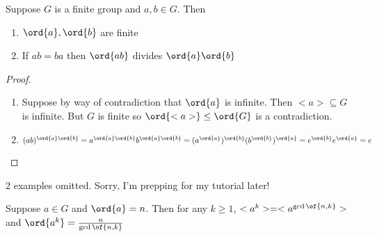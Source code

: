 \begin{corollary}
    Suppose $G$ is a finite group and $a,b \in G$. Then \begin{enumerate}
        \item $\ord{a}, \ord{b}$ are finite
        \item If $ab = ba$ then $\ord{ab}$ divides $\ord{a} \ord{b}$
    \end{enumerate}
\end{corollary}
\begin{proof}
    \begin{enumerate}
        \item Suppose by way of contradiction that $\ord{a}$ is infinite. Then $<a> \subseteq G$ is infinite. But $G$ is finite so $\ord{<a>} \leq \ord{G}$ is a contradiction.
        \item $(ab)^{\ord{a}\ord{b}} = a^{\ord{a}\ord{b}}b^{\ord{a}\ord{b}} = (a^{\ord{a}})^{\ord{b}}(b^{\ord{b}})^{\ord{a}} = e^{\ord{b}}e^{\ord{a}} = e$
    \end{enumerate}
\end{proof}

2 examples omitted. Sorry, I'm prepping for my tutorial later! 

\begin{theorem}
    Suppose $a \in G$ and $\ord{a} = n$. Then for any $k \geq 1$, $<a^k> = <a^{\gcd \of{n,k}}>$ and $\ord{a^k} = \frac{n}{\gcd \of{n, k}}$
\end{theorem}

